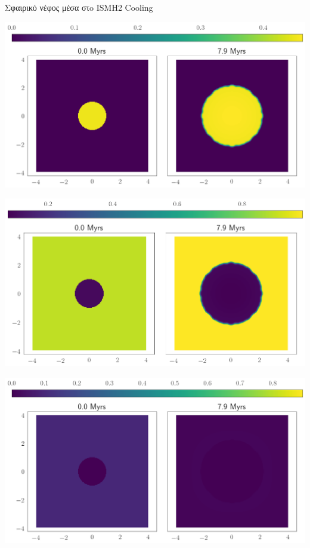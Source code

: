 \documentclass{beamer}
\begin{document}
\begin{frame}{Σφαιρικό νέφος μέσα στo ISM}{Η2 Cooling}
	\begin{center}
		\includegraphics[height=0.25\textheight]{../Document/DataImages/H2CoolingH2quad}
	\end{center}
	\begin{center}
		\includegraphics[height=0.25\textheight]{../Document/DataImages/H2CoolingHIquad}
	\end{center}
	\begin{center}
		\includegraphics[height=0.25\textheight]{../Document/DataImages/H2CoolingHIIquad}
	\end{center}
\end{frame}
\end{document}
